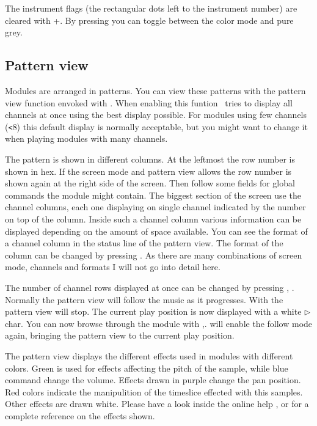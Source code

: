 The instrument flags (the rectangular dots left to the instrument
number) are cleared with +. By pressing 
you can toggle between the color mode and pure grey.

\subsection{Pattern view}
Modules are arranged in patterns. You can view these patterns with the
pattern view function envoked with . When enabling this
funtion
\cp\ tries to display all channels at once using the best display possible. For
modules using few channels (\texttt{<}8) this default display is
normally acceptable, but you might want to change it when playing
modules with many channels.

The pattern is shown in different columns. At the leftmost the row
number is shown in hex. If the screen mode and pattern view allows the
row number is shown again at the right side of the screen. Then follow
some fields for global commands the module might contain. The biggest
section of the screen use the channel columns, each one displaying on
single channel indicated by the number on top of the column. Inside
such a channel column various information can be displayed depending
on the amount of space available. You can see the format of a channel
column in the status line of the pattern view. The format of the
column can be changed by pressing . As there are many
combinations of screen mode, channels and formats I will not go into
detail here.

The number of channel rows displayed at once can be changed by
pressing
, . Normally the pattern view will follow the music
as it progresses. With  the pattern view will stop. The
current play position is now displayed with a white $\rhd$ char. You
can now browse through the module with
,.  will enable the follow mode
again, bringing the pattern view to the current play position.

The pattern view displays the different effects used in modules with
different colors. Green is used for effects affecting the pitch of the
sample, while blue command change the volume. Effects drawn in purple
change the pan position. Red colors indicate the manipulition of the
timeslice effected with this samples. Other effects are drawn
white. Please have a look inside the online help ,  or
 for a complete reference on the effects shown.

